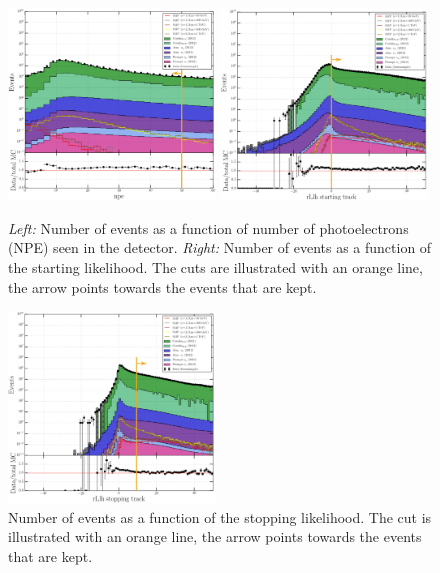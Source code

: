 \begin{figure}[ht]
\centering
\includegraphics[width=0.49\textwidth]{chapter8/img/L3_zenithcut_gr_1p4835298642_rloglcut_less_15_1D_stack_npe_new.png}
\includegraphics[width=0.49\textwidth]{chapter8/img/L3_zenithcut_gr_1p4835298642_rloglcut_less_15_npecut_less_50_1D_stack_finitereco_rllh_starting_new.png}
\caption{\textit{Left: }Number of events as a function of number of photoelectrons (NPE) seen in the detector. \textit{Right: }Number of events as a function of the starting likelihood. The cuts are illustrated with an orange line, the arrow points towards the events that are kept.}
\label{fig:level3cuts2}
\end{figure}

\begin{figure}[ht]
\centering
\includegraphics[width=0.49\textwidth]{chapter8/img/L3_zenithcut_gr_1p4835298642_rloglcut_less_15_npecut_less_50_startingtrackcut_hs_gr_0_1D_stack_finitereco_rllh_stopping_new.png}
\caption{Number of events as a function of the stopping likelihood. The cut is illustrated with an orange line, the arrow points towards the events that are kept.}
\label{fig:level3cuts3}
\end{figure}

